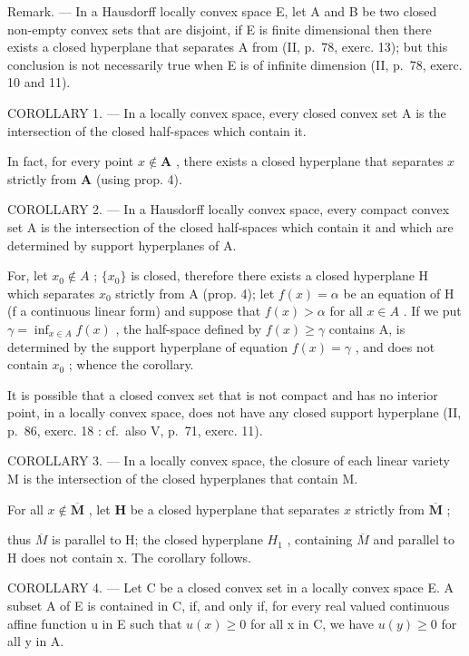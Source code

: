 Remark. --- In a Hausdorff locally convex space E, let A and B be two closed non-empty convex sets that are disjoint, if E is finite dimensional then there exists a closed hyperplane that separates A from (II, p.~78, exerc. 13); but this conclusion is not necessarily true when E is of infinite dimension (II, p.~78, exerc. 10 and 11).

COROLLARY 1. --- In a locally convex space, every closed convex set A is the intersection of the closed half-spaces which contain it.

In fact, for every point \(x \notin \mathbf{A}\) , there exists a closed hyperplane that separates \(x\) strictly from \(\mathbf{A}\) (using prop. 4).

COROLLARY 2. --- In a Hausdorff locally convex space, every compact convex set A is the intersection of the closed half-spaces which contain it and which are determined by support hyperplanes of A.

For, let \(x_{0} \notin A\) ; \(\{x_{0}\}\) is closed, therefore there exists a closed hyperplane H which separates \(x_{0}\) strictly from A (prop. 4); let \(f(x) = \alpha\) be an equation of H (f a continuous linear form) and suppose that \(f(x) > \alpha\) for all \(x \in A\) . If we put \(\gamma = \inf_{x \in A} f(x)\) , the half-space defined by \(f(x) \geqslant \gamma\) contains A, is determined by the support hyperplane of equation \(f(x) = \gamma\) , and does not contain \(x_{0}\) ; whence the corollary.

It is possible that a closed convex set that is not compact and has no interior point, in a locally convex space, does not have any closed support hyperplane (II, p.~86, exerc. 18 : cf.~also V, p.~71, exerc. 11).

COROLLARY 3. --- In a locally convex space, the closure of each linear variety M is the intersection of the closed hyperplanes that contain M.

For all \(x \notin \overline{\mathbf{M}}\) , let \(\mathbf{H}\) be a closed hyperplane that separates \(x\) strictly from \(\overline{\mathbf{M}}\) ;

thus \(\overline{M}\) is parallel to H; the closed hyperplane \(H_{1}\) , containing \(\overline{M}\) and parallel to H does not contain x. The corollary follows.

COROLLARY 4. --- Let C be a closed convex set in a locally convex space E. A subset A of E is contained in C, if, and only if, for every real valued continuous affine function u in E such that \(u(x) \geqslant 0\) for all x in C, we have \(u(y) \geqslant 0\) for all y in A.

